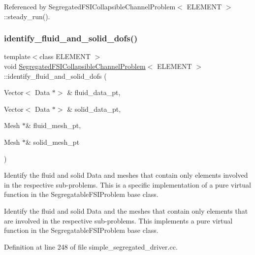 Referenced by Segregated\+F\+S\+I\+Collapsible\+Channel\+Problem$<$ E\+L\+E\+M\+E\+N\+T $>$\+::steady\+\_\+run().

\mbox{\label{classSegregatedFSICollapsibleChannelProblem_aa473522c98c5b70b8d35c0a7cdb1e42c}} 
\subsubsection{\texorpdfstring{identify\+\_\+fluid\+\_\+and\+\_\+solid\+\_\+dofs()}{identify\_fluid\_and\_solid\_dofs()}}
{\footnotesize\ttfamily template$<$class E\+L\+E\+M\+E\+NT $>$ \\
void \hyperlink{classSegregatedFSICollapsibleChannelProblem}{Segregated\+F\+S\+I\+Collapsible\+Channel\+Problem}$<$ E\+L\+E\+M\+E\+NT $>$\+::identify\+\_\+fluid\+\_\+and\+\_\+solid\+\_\+dofs (\begin{DoxyParamCaption}\item[{Vector$<$ Data $\ast$$>$ \&}]{fluid\+\_\+data\+\_\+pt,  }\item[{Vector$<$ Data $\ast$$>$ \&}]{solid\+\_\+data\+\_\+pt,  }\item[{Mesh $\ast$\&}]{fluid\+\_\+mesh\+\_\+pt,  }\item[{Mesh $\ast$\&}]{solid\+\_\+mesh\+\_\+pt }\end{DoxyParamCaption})}



Identify the fluid and solid Data and meshes that contain only elements involved in the respective sub-\/problems. This is a specific implementation of a pure virtual function in the Segregatable\+F\+S\+I\+Problem base class. 

Identify the fluid and solid Data and the meshes that contain only elements that are involved in the respective sub-\/problems. This implements a pure virtual function in the Segregatable\+F\+S\+I\+Problem base class. 

Definition at line 248 of file simple\+\_\+segregated\+\_\+driver.\+cc.



